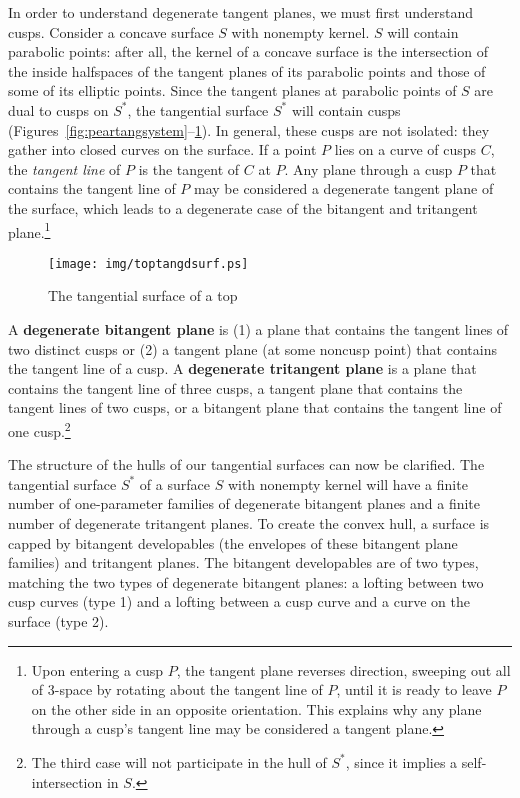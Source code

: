 \documentclass{elsart}
\begin{document}
In order to understand degenerate tangent planes, we must first understand cusps.
Consider a concave
surface $S$ with nonempty kernel.
$S$ will contain parabolic points:
after all, the kernel of a concave surface is the intersection of the inside
%
%
halfspaces of the tangent planes of its parabolic points
%
%
and those of some of its elliptic points.
Since the tangent planes at parabolic points of $S$ are dual to cusps on $S^*$,
the tangential surface $S^*$ will contain cusps 
(Figures~\ref{fig:peartangsystem}--\ref{fig:toptangdsurf}).
In general, these cusps are not isolated: they gather into closed curves on the surface.
If a point $P$ lies on a curve of cusps $C$,
the {\em tangent line} of $P$ is the tangent of $C$ at $P$.
Any plane through a cusp $P$ that contains the tangent line of $P$ may be considered
a degenerate tangent plane of the surface,
which leads to a degenerate case of the bitangent and tritangent plane.\footnote{Upon entering a cusp $P$, 
	the tangent plane reverses direction, sweeping out all of 3-space 
	by rotating about the tangent line of $P$,
	until it is ready to leave $P$ on the other side in an opposite orientation.
        This explains why any plane through a cusp's tangent line may be considered a tangent plane.}

\begin{figure}
\begin{center}
\texttt{[image: img/toptangdsurf.ps]}
\end{center}
\caption{The tangential surface of a top}
\label{fig:toptangdsurf}
\vskip 0.37in
\end{figure}

\begin{defn2}
A {\bf degenerate bitangent plane} is 
%
%
(1) a plane that contains the tangent lines of two distinct cusps or
(2) a tangent plane (at some noncusp point) that contains the tangent line of a cusp. 
A {\bf degenerate tritangent plane} is 
a plane that contains the tangent line of three cusps, 
a tangent plane that contains the tangent lines of two cusps,
or a bitangent plane that contains the tangent line of one cusp.\footnote{The
	third case will not participate in the hull of $S^*$, since
	it implies a self-intersection in $S$.}
\end{defn2}

The structure of the hulls of our tangential surfaces can now be clarified.
The tangential surface $S^*$ of a surface $S$ with nonempty kernel 
will have a finite number of one-parameter families of degenerate bitangent planes
and a finite number of degenerate tritangent planes.
To create the convex hull, a surface is capped by bitangent developables
(the envelopes of these bitangent plane families) and tritangent planes.
The bitangent developables
are of two types, matching the two types of degenerate bitangent planes: 
a lofting between two cusp curves (type 1) and
a lofting between a cusp curve and a curve on the surface (type 2).
\end{document}
